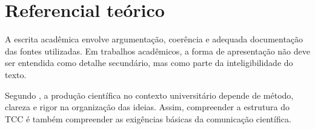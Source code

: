 
\chapter{Referencial teórico}

A escrita acadêmica envolve argumentação, coerência e adequada documentação das fontes utilizadas. Em trabalhos acadêmicos, a forma de apresentação não deve ser entendida como detalhe secundário, mas como parte da inteligibilidade do texto.

Segundo \textcite{severino2017}, a produção científica no contexto universitário depende de método, clareza e rigor na organização das ideias. Assim, compreender a estrutura do TCC é também compreender as exigências básicas da comunicação científica.

